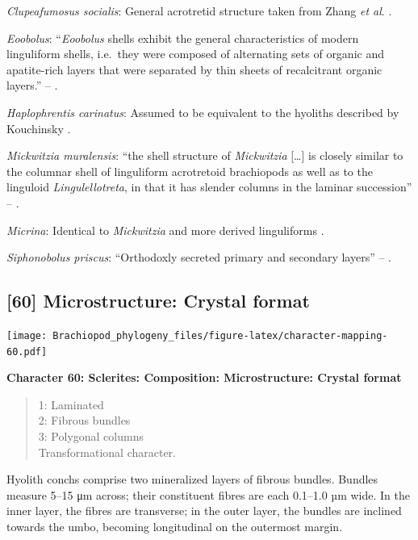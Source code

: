\documentclass[openany]{book}
\theoremstyle{definition}
\theoremstyle{definition}
\theoremstyle{definition}
\theoremstyle{remark}
\begin{document}
\hypertarget{Clupeafumosus_socialis-coding-59}{}
\emph{Clupeafumosus socialis}: General acrotretid structure taken from
Zhang \emph{et al}. \citeyearpar{Zhang2016Epithelialcell}.

\hypertarget{Eoobolus-coding-59}{}
\emph{Eoobolus}: ``\emph{Eoobolus} shells exhibit the general
characteristics of modern linguliform shells, i.e.~they were composed of
alternating sets of organic and apatite-rich layers that were separated
by thin sheets of recalcitrant organic layers.'' --
\citet{Balthasar2007Anearly}.

\hypertarget{Haplophrentis_carinatus-coding-59}{}
\emph{Haplophrentis carinatus}: Assumed to be equivalent to the hyoliths
described by Kouchinsky
\citeyearpar{Kouchinsky2000Skeletalmicrostructures}.

\hypertarget{Mickwitzia_muralensis-coding-59}{}
\emph{Mickwitzia muralensis}: ``the shell structure of \emph{Mickwitzia}
{[}\ldots{}{]} is closely similar to the columnar shell of linguliform
acrotretoid brachiopods as well as to the linguloid
\emph{Lingulellotreta}, in that it has slender columns in the laminar
succession'' -- \citet{Williams2007Supplement}.

\hypertarget{Micrina-coding-59}{}
\emph{Micrina}: Identical to \emph{Mickwitzia} and more derived
linguliforms \citep{Holmer2011Firstrecord}.

\hypertarget{Siphonobolus_priscus-coding-59}{}
\emph{Siphonobolus priscus}: ``Orthodoxly secreted primary and secondary
layers'' -- \citet{Williams2004Chemicostructure}.

\subsection*{{[}60{]} Microstructure: Crystal
format}\label{microstructure-crystal-format}

\texttt{[image: Brachiopod\_phylogeny\_files/figure-latex/character-mapping-60.pdf]}

\textbf{Character 60: Sclerites: Composition: Microstructure: Crystal
format}

\begin{quote}
1: Laminated\\
2: Fibrous bundles\\
3: Polygonal columns\\
Transformational character.
\end{quote}

Hyolith conchs comprise two mineralized layers of fibrous bundles.
Bundles measure 5--15 μm across; their constituent fibres are each
0.1--1.0 µm wide. In the inner layer, the fibres are transverse; in the
outer layer, the bundles are inclined towards the umbo, becoming
longitudinal on the outermost margin.
\end{document}
